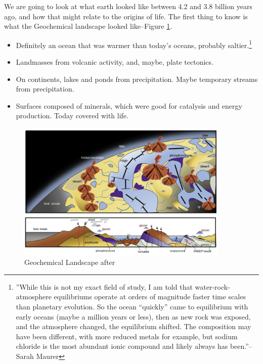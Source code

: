\documentclass[]{article}
\begin{document}
We are going to look at what earth looked like between 4.2 and 3.8 billion years ago, and how that might relate to the origins of life. The first thing to know is what the Geochemical landscape looked like--Figure \ref{fig:GeochemicalLandscape}.

  \begin{itemize}
	\item  Definitely an ocean that was warmer than today's oceans, probably saltier.\footnote{''While this is not my exact field of study, I am told that water-rock-atmosphere equilibriums operate at orders of magnitude faster time scales than planetary evolution. So the ocean “quickly” came to equilibrium with early oceans (maybe a million years or less), then as new rock was exposed, and the atmosphere changed, the equilibrium shifted. The composition may have been different, with more reduced metals for example, but sodium chloride is the most abundant ionic compound and likely always has been.''--Sarah Maurer}\cite{knauth1998salinity} 
	\item Landmasses from volcanic activity, and, maybe, plate tectonics.
	\item On continents, lakes and ponds from precipitation.  Maybe temporary streams from precipitation.
	\item Surfaces composed of minerals, which were good for catalysis and energy production. Today covered with life.
\end{itemize}

\begin{figure}[H]
	\caption[Geochemical Landscape]{Geochemical Landscape after \cite{kitadai2018origins}} \label{fig:GeochemicalLandscape}
	\includegraphics[width=0.9\textwidth]{GeochemicalLandscape}
\end{figure}
\end{document}
